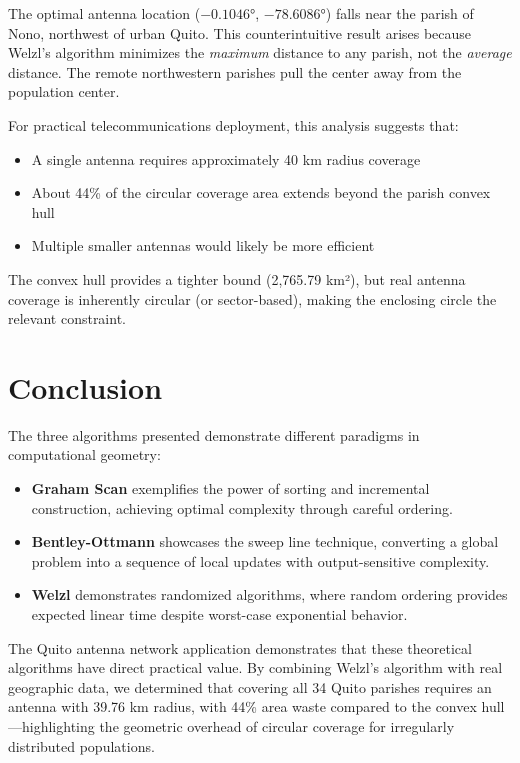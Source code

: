 \documentclass[11pt,a4paper]{article}
\begin{document}
The optimal antenna location ($-0.1046°$, $-78.6086°$) falls near the parish of Nono, northwest of urban Quito. This counterintuitive result arises because Welzl's algorithm minimizes the \textit{maximum} distance to any parish, not the \textit{average} distance. The remote northwestern parishes pull the center away from the population center.

For practical telecommunications deployment, this analysis suggests that:
\begin{itemize}
    \item A single antenna requires approximately 40 km radius coverage
    \item About 44\% of the circular coverage area extends beyond the parish convex hull
    \item Multiple smaller antennas would likely be more efficient
\end{itemize}

The convex hull provides a tighter bound (2,765.79 km²), but real antenna coverage is inherently circular (or sector-based), making the enclosing circle the relevant constraint.

\section{Conclusion}

The three algorithms presented demonstrate different paradigms in computational geometry:

\begin{itemize}
    \item \textbf{Graham Scan} exemplifies the power of sorting and incremental construction, achieving optimal complexity through careful ordering.

    \item \textbf{Bentley-Ottmann} showcases the sweep line technique, converting a global problem into a sequence of local updates with output-sensitive complexity.

    \item \textbf{Welzl} demonstrates randomized algorithms, where random ordering provides expected linear time despite worst-case exponential behavior.
\end{itemize}

The Quito antenna network application demonstrates that these theoretical algorithms have direct practical value. By combining Welzl's algorithm with real geographic data, we determined that covering all 34 Quito parishes requires an antenna with 39.76 km radius, with 44\% area waste compared to the convex hull---highlighting the geometric overhead of circular coverage for irregularly distributed populations.
\end{document}
